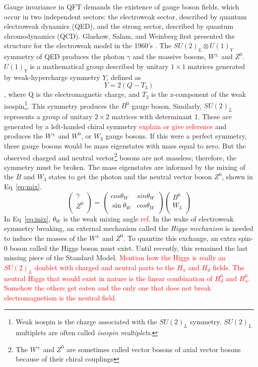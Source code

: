 Gauge invariance in QFT demands the existence of gauge boson fields, which occur in two independent sectors: the electroweak sector, described by quantum electroweak dynamics (QED), and the strong sector, described by quantum chromodynamics (QCD).  Glashow, Salam, and Weinberg first presented the structure for the electroweak model in the 1960's \cite{Glashow:1961tr, PhysRevLett.19.1264, Salam:1968rm}.  The $SU(2)_L\otimes U(1)_Y$ symmetry of QED produces the photon $\gamma$ and the massive bosons, $W^\pm$ and $Z^0$.  $U(1)_Y$ is a mathematical group described by unitary $1\times1$ matrices generated by weak-hypercharge symmetry $Y$, defined as 
\begin{equation}
Y=  2(Q-T_3)
\label{eq:Y}
\end{equation}
, where Q is the electromagnetic charge, and $T_3$ is the z-component of the weak isospin\footnote{Weak isospin is the charge associated with the $SU(2)_L$ symmetry.  $SU(2)_L$ multiplets are often called \textit{isospin multiplets}.}.   This symmetry produces the $B^0$ gauge boson.  Similarly, $SU(2)_L$ represents a group of unitary $2\times2$ matrices with determinant 1.  These are generated by a left-handed chiral symmetry \textcolor{red}{explain or give reference} and produces the $W^{\pm}$ and $W^0$, or $W_3$ gauge bosons.  If this were a perfect symmetry, these gauge bosons would be mass eigenstates with mass equal to zero. But the observed charged and neutral vector\footnote{The $W^{\pm}$ and $Z^0$ are sometimes called vector bosons of axial vector bosons because of their chiral couplings} bosons are not massless; therefore, the symmetry must be broken.  The mass eigenstates are informed by the mixing of the $B$ and $W_3$ states to get the  photon and the neutral vector boson $Z^0$, shown in Eq~\ref{eq:mix}.
\begin{equation}
\begin{pmatrix}
\gamma \\
Z^0 \\
\end{pmatrix}
=
\begin{pmatrix}
cos\theta_W & sin\theta_W\\
\sin\theta_W & cos\theta_W\\
\end{pmatrix}
\begin{pmatrix}
B^0 \\
W_3 \\
\end{pmatrix}
\label{eq:mix}
\end{equation}
In Eq~\ref{eq:mix}, $\theta_W$ is the weak mixing angle \textcolor{red}{ref}.  In the wake of electroweak symmetry breaking, an external mechanism called the \textit{Higgs mechanism} is needed to induce the masses of the $W^\pm$ and $Z^0$.  To quantize this exchange, an extra spin-0 boson called the Higgs boson must exist.  Until recently, this remained the last missing piece of the Standard Model.  \textcolor{red}{Mention how the Higgs is really an $SU(2)_L$ doublet with charged and neutral parts to the $H_u$ and $H_d$ fields.  The neutral Higgs that would exist in nature is the linear combination of $H_d^0$ and $H_u^0$.  Somehow the others get eaten and the only one that does not break electromagnetism is the neutral field.}
 
